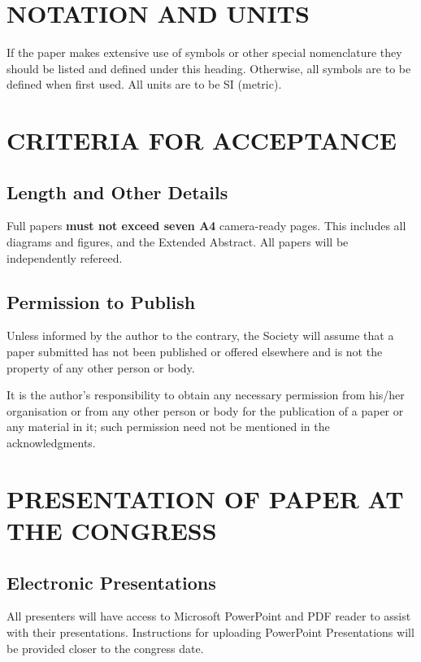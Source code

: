 \documentclass[a4paper,fleqn]{article} %
\begin{document}
\section{NOTATION AND UNITS}

If the paper makes extensive use of symbols or other special nomenclature they should be listed and defined under this heading.  Otherwise, all symbols are to be defined when first used.  All units are to be SI (metric).

\section{CRITERIA FOR ACCEPTANCE}

\subsection{Length and Other Details}
Full papers {\bfseries must not exceed seven A4} camera-ready pages. This includes all diagrams and figures, and the Extended Abstract. All papers will be independently refereed.

\subsection{Permission to Publish}
Unless informed by the author to the contrary, the Society will assume that a paper submitted has not been published or offered elsewhere and is not the property of any other person or body. \par

It is the author's responsibility to obtain any necessary permission from his/her organisation or from any other person or body for the publication of a paper or any material in it; such permission need not be mentioned in the acknowledgments. \par

\section{PRESENTATION OF PAPER AT THE CONGRESS}

\subsection{Electronic Presentations}
All presenters will have access to Microsoft PowerPoint and PDF reader to assist with their presentations. Instructions for uploading PowerPoint Presentations will be provided closer to the congress date.
\end{document}

